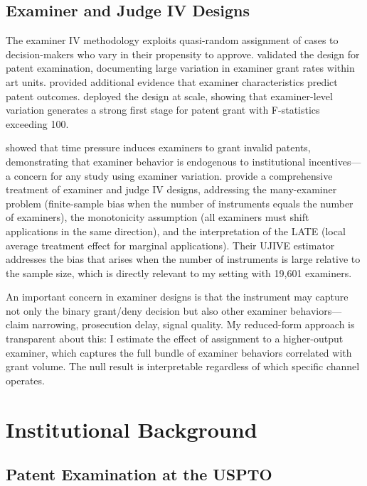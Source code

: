 \documentclass[12pt]{article}
\begin{document}
\subsection{Examiner and Judge IV Designs}

The examiner IV methodology exploits quasi-random assignment of cases to decision-makers who vary in their propensity to approve. \citet{lemley2012} validated the design for patent examination, documenting large variation in examiner grant rates within art units. \citet{cockburn2016} provided additional evidence that examiner characteristics predict patent outcomes. \citet{farremensa2020} deployed the design at scale, showing that examiner-level variation generates a strong first stage for patent grant with F-statistics exceeding 100.

\citet{frakes2017} showed that time pressure induces examiners to grant invalid patents, demonstrating that examiner behavior is endogenous to institutional incentives---a concern for any study using examiner variation. \citet{chyn2024} provide a comprehensive treatment of examiner and judge IV designs, addressing the many-examiner problem (finite-sample bias when the number of instruments equals the number of examiners), the monotonicity assumption (all examiners must shift applications in the same direction), and the interpretation of the LATE (local average treatment effect for marginal applications). Their UJIVE estimator addresses the bias that arises when the number of instruments is large relative to the sample size, which is directly relevant to my setting with 19,601 examiners.

An important concern in examiner designs is that the instrument may capture not only the binary grant/deny decision but also other examiner behaviors---claim narrowing, prosecution delay, signal quality. My reduced-form approach is transparent about this: I estimate the effect of assignment to a higher-output examiner, which captures the full bundle of examiner behaviors correlated with grant volume. The null result is interpretable regardless of which specific channel operates.


\section{Institutional Background}

\subsection{Patent Examination at the USPTO}
\end{document}
